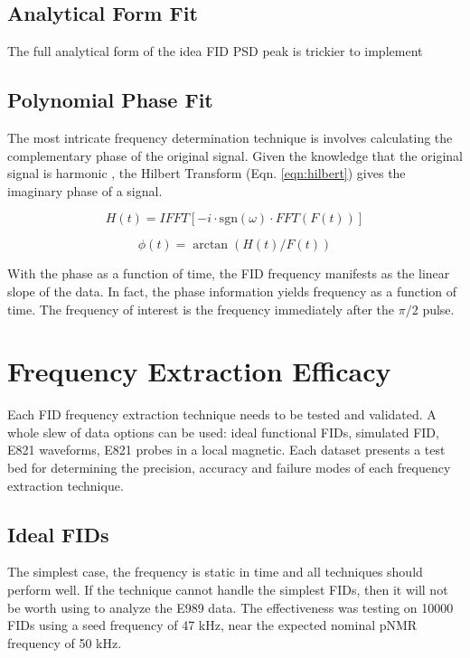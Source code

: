 \subsection{Analytical Form Fit}
The full analytical form of the idea FID PSD peak is trickier to implement


\subsection{Polynomial Phase Fit}
The most intricate frequency determination technique is involves calculating the complementary phase of the original signal.  Given the knowledge that the original signal is harmonic , the Hilbert Transform (Eqn. \ref{eqn:hilbert}) gives the imaginary phase of a signal.

\begin{equation}
H(t) = IFFT[-i \cdot \mathrm{sgn}(\omega) \cdot FFT(F(t))]
\label{eqn:hilbert}
\end{equation}

\begin{equation}
\phi(t) = \arctan(H(t) / F(t))
\label{eqn:phase}
\end{equation}

With the phase as a function of time, the FID frequency manifests as the linear slope of the data.  In fact, the phase information yields frequency as a function of time.  The frequency of interest is the frequency immediately after the $\pi/2$ pulse.


\section{Frequency Extraction Efficacy}

Each FID frequency extraction technique needs to be tested and validated.  A whole slew of data options can be used: ideal functional FIDs, simulated FID, E821 waveforms, E821 probes in a local \uw magnetic.  Each dataset presents a test bed for determining the precision, accuracy and failure modes of each frequency extraction technique.

\subsection{Ideal FIDs}
The simplest case, the frequency is static in time and all techniques should perform well.  If the technique cannot handle the simplest FIDs, then it will not be worth using to analyze the E989 data.  The effectiveness was testing on 10000 FIDs using a seed frequency of 47 kHz, near the expected nominal pNMR frequency of 50 kHz.  

